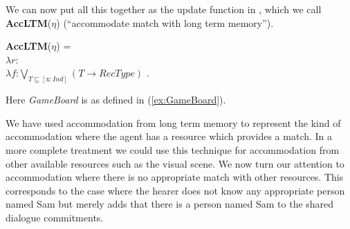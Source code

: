 We can now put all this together as the update function in \nexteg{},
which we call \textbf{AccLTM}($\eta$) (``accommodate match with long term memory'').
\begin{ex}
\textbf{AccLTM}($\eta$) =\\ 
$\lambda r$:\\
\hspace*{1em}$\lambda
f$:$\displaystyle{\bigvee_{T\sqsubseteq [\mathrm{x}:\mathit{Ind}]}}(T\rightarrow \mathit{RecType})$ . \\
\hspace*{2em} 
\end{ex} 
Here \textit{GameBoard} is as defined in (\ref{ex:GameBoard}).
     
We have used accommodation from long term memory to represent the kind
of accommodation where the agent has a resource which provides a
match.  In a more complete treatment we could use this technique for
accommodation from other available resources such as the visual scene.
We now turn our attention to accommodation where there is no
appropriate match
with other resources.  This corresponds to the case where the hearer
does not know any appropriate person named Sam but merely adds that
there is a person named Sam to the shared dialogue commitments.

